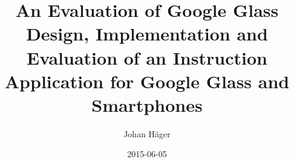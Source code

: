 \documentclass[12pt,twoside]{kau_report}
\title{An Evaluation of Google Glass\\ 
\large Design, Implementation and Evaluation of an Instruction Application for Google Glass and Smartphones}
\author{Johan H\"{a}ger}
\date{2015-06-05}
\begin{document}
\makekautitle

\copyrightpage

\begin{frontmatter}

\approved


\end{frontmatter}
\end{document}
